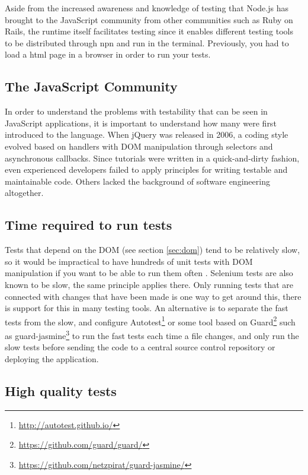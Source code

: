 \documentclass[11pt]{article}
\begin{document}
Aside from the increased awareness and knowledge of testing that Node.js has brought to the JavaScript community from other communities such as Ruby on Rails, the runtime itself facilitates testing since it enables different testing tools to be distributed through npn and run in the terminal. Previously, you had to load a html page in a browser in order to run your tests. \cite[question~9]{Stenmark}

\subsection{The JavaScript Community}

In order to understand the problems with testability that can be seen in JavaScript applications, it is important to understand how many were first introduced to the language. When jQuery was released in 2006, a coding style evolved based on handlers with DOM manipulation through selectors and asynchronous callbacks. Since tutorials were written in a quick-and-dirty fashion, even experienced developers failed to apply principles for writing testable and maintainable code. Others lacked the background of software engineering altogether. \cite[question~10]{Stenmark}

\subsection{Time required to run tests}

Tests that depend on the DOM (see section \ref{sec:dom}) tend to be relatively slow, so it would be impractical to have hundreds of unit tests with DOM manipulation if you want to be able to run them often \cite[questions~21-22]{Stenmark}. Selenium tests are also known to be slow, the same principle applies there. Only running tests that are connected with changes that have been made is one way to get around this, there is support for this in many testing tools. An alternative is to separate the fast tests from the slow, and configure Autotest\footnote{\url{http://autotest.github.io/}} or some tool based on Guard\footnote{\url{https://github.com/guard/guard/}} such as guard-jasmine\footnote{\url{https://github.com/netzpirat/guard-jasmine/}} to run the fast tests each time a file changes, and only run the slow tests before sending the code to a central source control repository or deploying the application.

\subsection{High quality tests}
\label{HighQuality}
\end{document}
